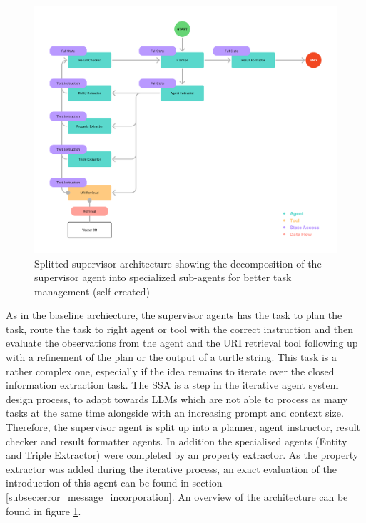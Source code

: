 \documentclass[a4paper,oneside,bibliography=totoc]{scrbook}
\begin{document}
\begin{figure}[h]
  \centering
  \includegraphics[width=\textwidth]{figures/Splitted Supervisor Architecture.png}
  \caption{Splitted supervisor architecture showing the decomposition of the supervisor agent into specialized sub-agents for better task management (self created)}
  \label{fig:splitted_supervisor_architecture}
\end{figure}

As in the baseline archiecture, the supervisor agents has the task to plan the task, route the task to right agent or tool with the correct instruction and then evaluate the observations from the agent and the URI retrieval tool following up with a refinement of the plan or the output of a turtle string. This task is a rather complex one, especially if the idea remains to iterate over the closed information extraction task. The \ac{SSA} is a step in the iterative agent system design process, to adapt towards \acp{LLM} which are not able to process as many tasks at the same time alongside with an increasing prompt and context size. Therefore, the supervisor agent is split up into a planner, agent instructor, result checker and result formatter agents. In addition the specialised agents (Entity and Triple Extractor) were completed by an property extractor. As the property extractor was added during the iterative process, an exact evaluation of the introduction of this agent can be found in section \ref{subsec:error_message_incorporation}. An overview of the architecture can be found in figure \ref{fig:splitted_supervisor_architecture}.
\end{document}
